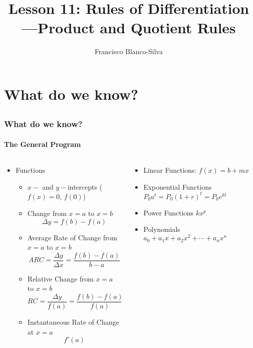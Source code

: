 \documentclass[9pt,xcolor=x11names,compress]{beamer}
\title{Lesson 11: Rules of Differentiation---Product and Quotient Rules}
\author[Francisco Blanco-Silva]{Francisco Blanco-Silva}
\institute[USC]{University of South Carolina}
\date{
\pgfdeclarelindenmayersystem{Gosper curve}{
	\rule{XF -> XF+YF++YF-XF--XFXF-YF+}
	\rule{YF -> -XF+YFYF++YF+XF--XF-YF}
}
\begin{tikzpicture}[color=DeepSkyBlue4]
\draw [l-system={Gosper curve, axiom=XF, order=5, step=0.6pt, angle=60}]
lindenmayer system; 
\end{tikzpicture}
}
\begin{document}
\frame{\titlepage}

\section{What do we know?}
\subsection{}

\begin{frame}
\frametitle{What do we know?}
\framesubtitle{The General Program}
\begin{columns}[T]
\begin{column}{0.6\linewidth}
\begin{itemize}
\item Functions
\begin{itemize}
\item $x-$ and $y-$\alert{intercepts} ($f(x)=0$, $f(0)$)
\item \alert{Change} from $x=a$ to $x=b$ 
\begin{equation*}
	\Delta y = f(b)-f(a)
\end{equation*}
\item \alert{Average Rate of Change} from $x=a$ to $x=b$
\begin{equation*}
ARC=\frac{\Delta y}{\Delta x}=\frac{f(b)-f(a)}{b-a} 
\end{equation*}
\item \alert{Relative Change} from $x=a$ to $x=b$
\begin{equation*}
RC=\frac{\Delta y}{f(a)}=\frac{f(b)-f(a)}{f(a)}
\end{equation*}
\item \alert{Instantaneous Rate of Change} at $x=a$
\begin{equation*}
	f'(a)
\end{equation*}
\end{itemize}
\end{itemize}
\end{column}
\begin{column}{0.4\linewidth}
\begin{itemize}
	\item Linear Functions: $f(x)=b+mx$
	\item Exponential Functions $P_0 a^t = P_0 (1+r)^t = P_0 e^{kt}$
	\item Power Functions \newline \makebox[1cm]{} $kx^p$
	\item Polynomials $a_0+a_1x+a_2x^2+\dotsb+a_n x^n$
\end{itemize}
\end{column}
\end{columns}
\end{frame}
\end{document}
